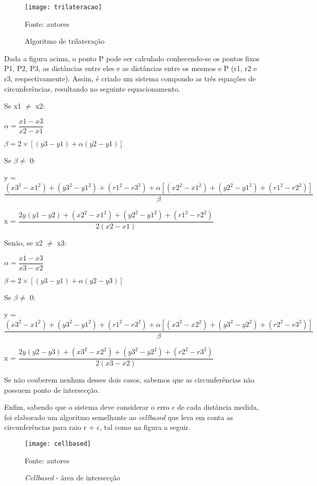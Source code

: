 \begin{figure}[ht]
  \centering
    \caption{Algoritmo de trilateração}
    \texttt{[image: trilateracao]}
	\centerline{\small{Fonte: autores}}
\end{figure}
\FloatBarrier

Dada a figura acima, o ponto P pode ser calculado conhecendo-se os pontos fixos P1, P2, P3, as distâncias entre eles e as distâncias entre os mesmos e P (r1, r2 e r3, respectivamente). Assim, é criado um sistema compondo as três equações de circunferências, resultando no seguinte equacionamento.

Se x1 $\neq$ x2:

\quad $\alpha = \dfrac{x1 - x3}{x2 - x1}$

\quad $\beta = 2 \times [(y3 - y1) + \alpha(y2 - y1)]$

\quad Se $\beta \neq$ 0:

\quad \quad y = $\dfrac{(x3^2 - x1^2) + (y3^2 - y1^2) + (r1^2 - r3^2) + \alpha[(x2^2 - x1^2) + (y2^2 - y1^2) + (r1^2 - r2^2)]}{\beta}$

\quad \quad x = $\dfrac{2y(y1 - y2) + (x2^2 - x1^2) + (y2^2 - y1^2) + (r1^2 - r2^2)}{2(x2 - x1)}$

Senão, se x2 $\neq$ x3:

\quad $\alpha = \dfrac{x1 - x3}{x3 - x2}$

\quad $\beta = 2 \times [(y3 - y1) + \alpha(y2 - y3)]$

\quad Se $\beta \neq$ 0:

\quad \quad y = $\dfrac{(x3^2 - x1^2) + (y3^2 - y1^2) + (r1^2 - r3^2) + \alpha[(x3^2 - x2^2) + (y3^2 - y2^2) + (r2^2 - r3^2)]}{\beta}$

\quad \quad x = $\dfrac{2y(y2 - y3) + (x3^2 - x2^2) + (y3^2 - y2^2) + (r2^2 - r3^2)}{2(x3 - x2)}$

Se não couberem nenhum desses dois casos, sabemos que as circunferências não possuem ponto de intersecção.

Enfim, sabendo que o sistema deve considerar o erro $\epsilon$ de cada distância medida, foi elaborado um algoritmo semelhante ao \emph{cellbased} \cite{larissaamaralmiltonbiscaro} que leva em conta as circunferências para raio r + $\epsilon$, tal como na figura a seguir.

\begin{figure}[ht]
  \centering
  \caption{\emph{Cellbased} - área de intersecção}
    \texttt{[image: cellbased]}
	\centerline{\small{Fonte: autores}}
\end{figure}
\FloatBarrier

